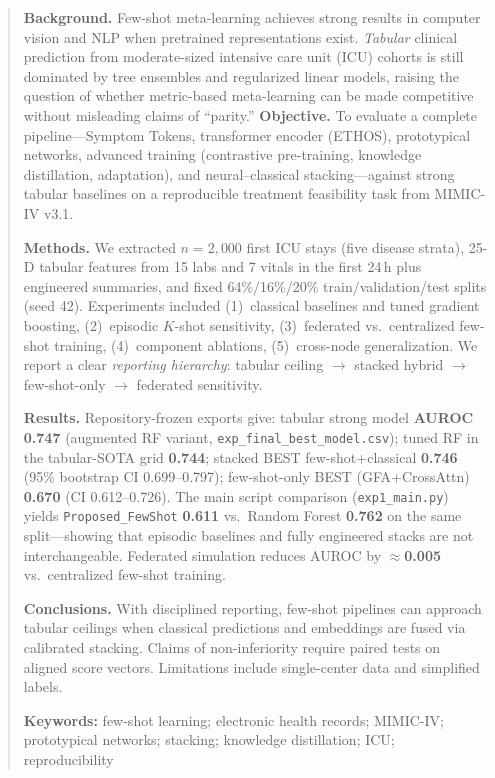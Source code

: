 \begin{abstract}
\noindent\textbf{Background.} Few-shot meta-learning achieves strong results in computer vision and NLP when pretrained representations exist. \emph{Tabular} clinical prediction from moderate-sized intensive care unit (ICU) cohorts is still dominated by tree ensembles and regularized linear models, raising the question of whether metric-based meta-learning can be made competitive without misleading claims of ``parity.''
\noindent\textbf{Objective.} To evaluate a complete pipeline---Symptom Tokens, transformer encoder (ETHOS), prototypical networks, advanced training (contrastive pre-training, knowledge distillation, adaptation), and neural--classical stacking---against strong tabular baselines on a reproducible treatment feasibility task from MIMIC-IV v3.1.

\noindent\textbf{Methods.} We extracted $n{=}2{,}000$ first ICU stays (five disease strata), 25-D tabular features from 15 labs and 7 vitals in the first 24\,h plus engineered summaries, and fixed 64\%/16\%/20\% train/validation/test splits (seed 42). Experiments included (1)~classical baselines and tuned gradient boosting, (2)~episodic $K$-shot sensitivity, (3)~federated vs.\ centralized few-shot training, (4)~component ablations, (5)~cross-node generalization. We report a clear \emph{reporting hierarchy}: tabular ceiling $\rightarrow$ stacked hybrid $\rightarrow$ few-shot-only $\rightarrow$ federated sensitivity.

\noindent\textbf{Results.} Repository-frozen exports give: tabular strong model \textbf{AUROC 0.747} (augmented RF variant, \texttt{exp\_final\_best\_model.csv}); tuned RF in the tabular-SOTA grid \textbf{0.744}; stacked BEST few-shot+classical \textbf{0.746} (95\% bootstrap CI 0.699--0.797); few-shot-only BEST (GFA+CrossAttn) \textbf{0.670} (CI 0.612--0.726). The main script comparison (\texttt{exp1\_main.py}) yields \texttt{Proposed\_FewShot} \textbf{0.611} vs.\ Random Forest \textbf{0.762} on the same split---showing that episodic baselines and fully engineered stacks are not interchangeable. Federated simulation reduces AUROC by $\approx$\textbf{0.005} vs.\ centralized few-shot training.

\noindent\textbf{Conclusions.} With disciplined reporting, few-shot pipelines can approach tabular ceilings when classical predictions and embeddings are fused via calibrated stacking. Claims of non-inferiority require paired tests on aligned score vectors. Limitations include single-center data and simplified labels.

\medskip
\noindent\textbf{Keywords:} few-shot learning; electronic health records; MIMIC-IV; prototypical networks; stacking; knowledge distillation; ICU; reproducibility
\end{abstract}
